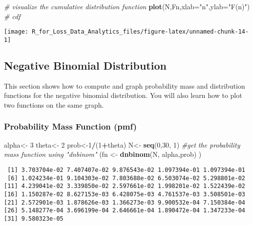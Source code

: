 \documentclass[]{book}
\newenvironment{Shaded}{\begin{snugshade}}{\end{snugshade}}
\newcommand{\KeywordTok}[1]{\textcolor[rgb]{0.13,0.29,0.53}{\textbf{#1}}}
\newcommand{\DataTypeTok}[1]{\textcolor[rgb]{0.13,0.29,0.53}{#1}}
\newcommand{\DecValTok}[1]{\textcolor[rgb]{0.00,0.00,0.81}{#1}}
\newcommand{\StringTok}[1]{\textcolor[rgb]{0.31,0.60,0.02}{#1}}
\newcommand{\CommentTok}[1]{\textcolor[rgb]{0.56,0.35,0.01}{\textit{#1}}}
\newcommand{\OperatorTok}[1]{\textcolor[rgb]{0.81,0.36,0.00}{\textbf{#1}}}
\newcommand{\NormalTok}[1]{#1}
\theoremstyle{definition}
\theoremstyle{definition}
\theoremstyle{definition}
\theoremstyle{remark}
\begin{document}
\begin{Shaded}
\begin{Highlighting}[]
\CommentTok{# visualize the cumulative distribution function}
\KeywordTok{plot}\NormalTok{(N,Fn,}\DataTypeTok{xlab=}\StringTok{"n"}\NormalTok{,}\DataTypeTok{ylab=}\StringTok{"F(n)"}\NormalTok{) }\CommentTok{# cdf}
\end{Highlighting}
\end{Shaded}

\begin{center}\texttt{[image: R\_for\_Loss\_Data\_Analytics\_files/figure-latex/unnamed-chunk-14-1]} \end{center}

\subsection{Negative Binomial
Distribution}\label{negative-binomial-distribution}

This section shows how to compute and graph probability mass and
distribution functions for the negative binomial distribution. You will
also learn how to plot two functions on the same graph.

\subsubsection{Probability Mass Function
(pmf)}\label{probability-mass-function-pmf-1}

\begin{Shaded}
\begin{Highlighting}[]
\NormalTok{alpha<-}\StringTok{ }\DecValTok{3}
\NormalTok{theta<-}\StringTok{ }\DecValTok{2}
\NormalTok{prob<-}\DecValTok{1}\OperatorTok{/}\NormalTok{(}\DecValTok{1}\OperatorTok{+}\NormalTok{theta)}
\NormalTok{N<-}\StringTok{ }\KeywordTok{seq}\NormalTok{(}\DecValTok{0}\NormalTok{,}\DecValTok{30}\NormalTok{, }\DecValTok{1}\NormalTok{)}
\CommentTok{#get the probability mass function using "dnbinom"}
\NormalTok{(fn <-}\StringTok{ }\KeywordTok{dnbinom}\NormalTok{(N, alpha,prob) )}
\end{Highlighting}
\end{Shaded}

\begin{verbatim}
 [1] 3.703704e-02 7.407407e-02 9.876543e-02 1.097394e-01 1.097394e-01
 [6] 1.024234e-01 9.104303e-02 7.803688e-02 6.503074e-02 5.298801e-02
[11] 4.239041e-02 3.339850e-02 2.597661e-02 1.998201e-02 1.522439e-02
[16] 1.150287e-02 8.627153e-03 6.428075e-03 4.761537e-03 3.508501e-03
[21] 2.572901e-03 1.878626e-03 1.366273e-03 9.900532e-04 7.150384e-04
[26] 5.148277e-04 3.696199e-04 2.646661e-04 1.890472e-04 1.347233e-04
[31] 9.580323e-05
\end{verbatim}
\end{document}
